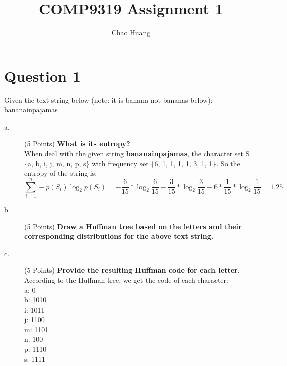 \documentclass[a4paper]{article}
\author{Chao Huang}
\title{COMP9319 Assignment 1}
\begin{document}
\maketitle


\section*{Question 1}
  \begin{spacing}{1.5}
    \noindent{}Given the text string below (note: it is banana not bananas below):\\
    \noindent{}bananainpajamas
    \begin{description}
      \item[a.] (5 Points) \textbf{What is its entropy?}\\
      \noindent{}When deal with the given string \textbf{bananainpajamas}, the character set S=\{a, b, i, j, m, n, p, s\} with frequency set \{6, 1, 1, 1, 1, 3, 1, 1\}. So the entropy of the string is:
      \[
        \sum_{i=1}^{n} -p(S_i)\log_2 {p(S_i)} = -\frac{6}{15}*\log_2 {\frac{6}{15}} - \frac{3}{15}*\log_2 {\frac{3}{15}} - 6 * \frac{1}{15}*\log_2 {\frac{1}{15}} = 1.25
      \]
      \item[b.] (5 Points) \textbf{Draw a Huffman tree based on the letters and their corresponding distributions for the above text string.}\\
      \item[c.] (5 Points) \textbf{Provide the resulting Huffman code for each letter.}\\
      \noindent{}According to the Huffman tree, we get the code of each character:\\
      a: 0\\
      b: 1010\\
      i: 1011\\
      j: 1100\\
      m: 1101\\
      n: 100\\
      p: 1110\\
      s: 1111\\

\end{description}
\end{spacing}
\end{document}
